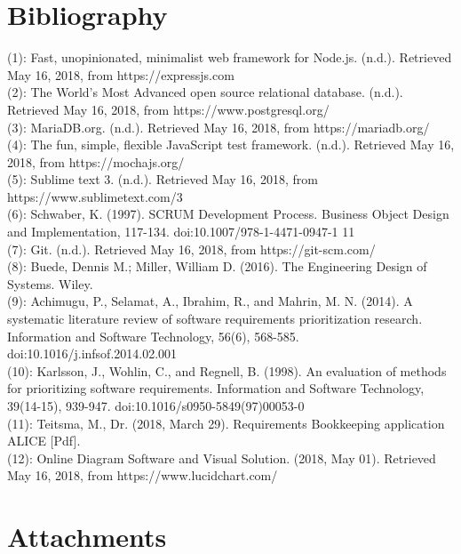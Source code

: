 \documentclass[paper=a4, fontsize=11pt,twoside]{scrartcl}	%
\begin{document}
\section{Bibliography}
(1): Fast, unopinionated, minimalist web framework for Node.js. (n.d.). Retrieved May 16, 2018, from https://expressjs.com \\ 
(2): The World's Most Advanced open source relational database. (n.d.). Retrieved May 16, 2018, from https://www.postgresql.org/ \\
(3): MariaDB.org. (n.d.). Retrieved May 16, 2018, from https://mariadb.org/  \\
(4): The fun, simple, flexible JavaScript test framework. (n.d.). Retrieved May 16, 2018, from https://mochajs.org/ \\
(5): Sublime text 3. (n.d.). Retrieved May 16, 2018, from https://www.sublimetext.com/3 \\
(6): Schwaber, K. (1997). SCRUM Development Process. Business Object Design and Implementation, 117-134. doi:10.1007/978-1-4471-0947-1 11\\ 
(7): Git. (n.d.). Retrieved May 16, 2018, from https://git-scm.com/ \\
(8): Buede, Dennis M.; Miller, William D. (2016). The Engineering Design of Systems. Wiley. \\
(9): Achimugu, P., Selamat, A., Ibrahim, R., and Mahrin, M. N. (2014). A systematic literature review of software requirements prioritization research. Information and Software Technology, 56(6), 568-585. doi:10.1016/j.infsof.2014.02.001 \\
(10): Karlsson, J., Wohlin, C., and Regnell, B. (1998). An evaluation of methods for prioritizing software requirements. Information and Software Technology, 39(14-15), 939-947. doi:10.1016/s0950-5849(97)00053-0 \\
(11): Teitsma, M., Dr. (2018, March 29). Requirements Bookkeeping application ALICE [Pdf]. \\
(12): Online Diagram Software and Visual Solution. (2018, May 01). Retrieved May 16, 2018, from https://www.lucidchart.com/









 
\newpage

\section{Attachments}
\end{document}
